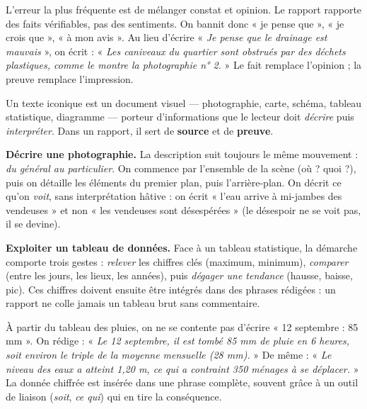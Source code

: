 \documentclass[11pt]{article}
\newcommand{\cle}[1]{{\popxbold\color{popdark}#1}}
\newcounter{popsec}
\newcounter{popsub}
\newcommand{\courssub}[1]{%
  \stepcounter{popsub}%
  \par\vspace{9pt}\noindent{\popxbold\fontsize{11.5}{13}\selectfont\color{popink}{\color{poporange}\thepopsec.\thepopsub}\hspace{6pt}#1}\par\nopagebreak\vspace{4pt}
}
\begin{document}
\begin{attention}
L'erreur la plus fréquente est de mélanger constat et opinion. Le rapport rapporte des \cle{faits vérifiables}, pas des sentiments. On bannit donc « je pense que », « je crois que », « à mon avis ». Au lieu d'écrire « \emph{Je pense que le drainage est mauvais} », on écrit : « \emph{Les caniveaux du quartier sont obstrués par des déchets plastiques, comme le montre la photographie n° 2.} » Le fait remplace l'opinion ; la preuve remplace l'impression.
\end{attention}

\courssub{Lire les textes iconiques}

\begin{definition}
Un \cle{texte iconique} est un document visuel — photographie, carte, schéma, tableau statistique, diagramme — porteur d'informations que le lecteur doit \emph{décrire} puis \emph{interpréter}. Dans un rapport, il sert de \textbf{source} et de \textbf{preuve}.
\end{definition}

\textbf{Décrire une photographie.} La description suit toujours le même mouvement : \emph{du général au particulier}. On commence par l'ensemble de la scène (où ? quoi ?), puis on détaille les éléments du premier plan, puis l'arrière-plan. On décrit ce qu'on \emph{voit}, sans interprétation hâtive : on écrit « l'eau arrive à mi-jambes des vendeuses » et non « les vendeuses sont désespérées » (le désespoir ne se voit pas, il se devine).

\textbf{Exploiter un tableau de données.} Face à un tableau statistique, la démarche comporte trois gestes : \emph{relever} les chiffres clés (maximum, minimum), \emph{comparer} (entre les jours, les lieux, les années), puis \emph{dégager une tendance} (hausse, baisse, pic). Ces chiffres doivent ensuite être intégrés dans des phrases rédigées : un rapport ne colle jamais un tableau brut sans commentaire.

\begin{exemplebox}
À partir du tableau des pluies, on ne se contente pas d'écrire « 12 septembre : 85 mm ». On rédige : « \emph{Le 12 septembre, il est tombé 85 mm de pluie en 6 heures, soit environ le triple de la moyenne mensuelle (28 mm).} » De même : « \emph{Le niveau des eaux a atteint 1,20 m, ce qui a contraint 350 ménages à se déplacer.} » La donnée chiffrée est insérée dans une phrase complète, souvent grâce à un outil de liaison (\emph{soit}, \emph{ce qui}) qui en tire la conséquence.
\end{exemplebox}
\end{document}
